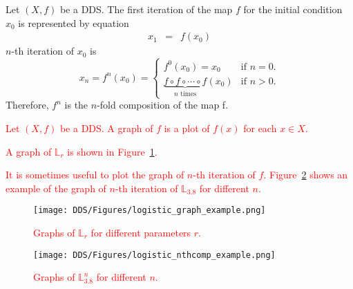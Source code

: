 \begin{definition}
    Let $\left( X, f \right)$ be a DDS. 
    The first iteration of the map $f$ for the initial condition $x_0$ is represented by equation
    \begin{eqnarray}
        x_{1}  & = & f(x_{0})
    \end{eqnarray}
    $n$-th iteration of $x_0$ is
    \begin{equation}
    x_{n} = f^{n}(x_0) =
        \begin{cases}
            f^{0}(x_0) = x_0 & \text{if } n = 0. \\
            \underbrace{f \circ f \circ \cdots \circ f}_\text{$n$ times}(x_0) & \text{if } n > 0. 
        \end{cases}
    \end{equation}
    Therefore, $f^{n}$ is the $n$-fold composition of the map f.
\end{definition}

\begin{definition}[Graph]
\textcolor{red}{
    Let $\left( X, f \right)$ be a DDS. A graph of $f$ is a plot of $f(x)$ for each $x \in X$.
}
\end{definition}

\begin{remark}
    \textcolor{red}{
    A graph of $\mathbb{L}_{r}$ is shown in Figure~\ref{fig:logistic_graph_example}.
    }
    \par
    \textcolor{red}{
    It is sometimes useful to plot the graph of $n$-th iteration of $f$.
     Figure~\ref{fig:logistic_nthcomp_example} shows an example of the graph of $n$-th iteration of $\mathbb{L}_{3.8}$ for different $n$.
    }
\end{remark}

\begin{figure}[!h]
    \centering
    \texttt{[image: DDS/Figures/logistic\_graph\_example.png]}
    \caption{
        \textcolor{red}{
        Graphs of $\mathbb{L}_{r}$ for different parameters $r$.
        }
    }
    \label{fig:logistic_graph_example}
\end{figure}

\begin{figure}[!h]
    \centering
    \texttt{[image: DDS/Figures/logistic\_nthcomp\_example.png]}
    \caption{
        \textcolor{red}{
        Graphs of $\mathbb{L}_{3.8}^{n}$ for different $n$.
        }
    }
    \label{fig:logistic_nthcomp_example}
\end{figure}


